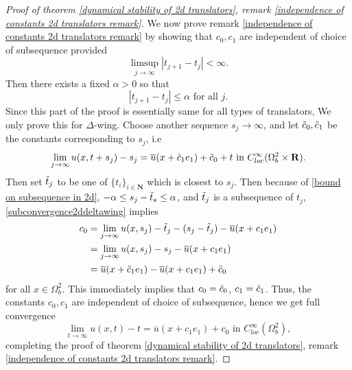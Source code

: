\documentclass[pdflatex,sn-mathphys-num]{sn-jnl}%
\begin{document}
\begin{proof}[Proof of theorem \ref{dynamical stability of 2d translators}, remark \ref{independence of constants 2d translators remark}]
We now prove remark \ref{independence of constants 2d translators remark} by showing that $c_0, c_1$ are independent of choice of subsequence provided
\begin{equation}
    \limsup_{j \to \infty}|t_{j+1} - t_j| < \infty.
\end{equation}
Then there exists a fixed $\alpha > 0$ so that
\begin{equation}\label{bound on subsequence in 2d}
  |t_{j+1} - t_j| \leq \alpha \text{ for all }j.  
\end{equation}
 Since this part of the proof is essentially same for all types of translators, We only prove this for $\Delta$-wing. Choose another sequence $s_j\to \infty$, and let $\Tilde{c}_0, \Tilde{c}_1$ be the constants corresponding to $s_j$, i.e
 \begin{equation}
      \lim_{j\to \infty}u(x, t+s_j) - s_j = \overline{u}(x + \Tilde{c}_1e_1) + \Tilde{c}_0 +t\text{ in }C^{\infty}_{loc}(\Omega^2_b\times \mathbf{R}).
 \end{equation}
 Then set $\Tilde{t}_j$ to be one of $\{t_i\}_{i \in \mathbf{N}}$ which is closest to $s_j$. Then because of \eqref{bound on subsequence in 2d}, $-\alpha \leq s_j - \Tilde{t}_s \leq \alpha$, and $\Tilde{t}_j$ is a subsequence of $t_j$, \eqref{subconvergence2ddeltawing} implies 
\begin{align*}
    c_0 &= \lim_{j\to \infty}u(x, s_j) - \Tilde{t}_j -(s_j-\Tilde{t}_j) - \overline{u}(x+c_1e_1)\\& = \lim_{j \to \infty}u(x, s_j) - s_j - \overline{u}(x + c_1e_1) \\&= \overline{u}(x + \Tilde{c}_1e_1) -\overline{u}(x + c_1e_1)+ \Tilde{c}_0
\end{align*}
for all $x \in \Omega^2_b$. This immediately implies that $c_0 = \Tilde{c}_0$, $c_1 = \Tilde{c}_1$. Thus, the constants $c_0, c_1$ are independent of choice of subsequence, hence we get full convergence
\begin{equation}
    \lim_{t\to \infty}u(x,t) - t = \overline{u}(x + c_1e_1) + c_0 \text{ in }C^{\infty}_{loc}(\Omega_b^2),
\end{equation}
completing the proof of theorem \ref{dynamical stability of 2d translators}, remark \ref{independence of constants 2d translators remark}.
\end{proof}
\end{document}
